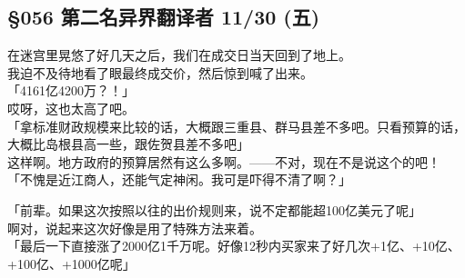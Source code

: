 \subsection{§056 第二名异界翻译者 11/30 (五)}

在迷宫里晃悠了好几天之后，我们在成交日当天回到了地上。\\

我迫不及待地看了眼最终成交价，然后惊到喊了出来。\\

「4161亿4200万？！」\\

哎呀，这也太高了吧。\\

「拿标准财政规模来比较的话，大概跟三重县、群马县差不多吧。只看预算的话，大概比岛根县高一些，跟佐贺县差不多吧」\\

这样啊。地方政府的预算居然有这么多啊。——不对，现在不是说这个的吧！\\

「不愧是近江商人，还能气定神闲。我可是吓得不清了啊？」

「前辈。如果这次按照以往的出价规则来，说不定都能超100亿美元了呢」\\

啊对，说起来这次好像是用了特殊方法来着。\\

「最后一下直接涨了2000亿1千万呢。好像12秒内买家来了好几次+1亿、+10亿、+100亿、+1000亿呢」\\

